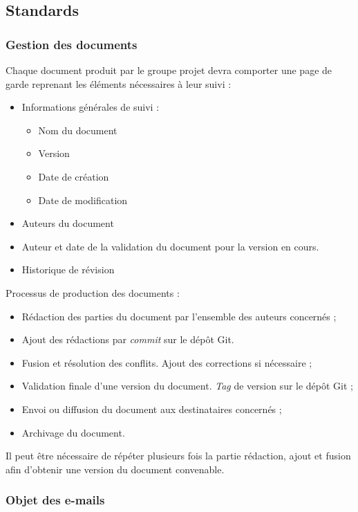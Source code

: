 \documentclass[10pt,a4paper]{article}
\begin{document}
\subsection{Standards}

\subsubsection{Gestion des documents}

Chaque document produit par le groupe projet devra comporter une page de garde reprenant les éléments nécessaires à leur suivi :
\begin{itemize}
\item Informations générales de suivi :
\begin{itemize} 
	\renewcommand{\labelitemii}{$\cdot$}
	\item Nom du document
	\item Version
	\item Date de création
	\item Date de modification
\end{itemize}
\item Auteurs du document
\item Auteur et date de la validation du document pour la version en cours.
\item Historique de révision
\end{itemize}

\noindent Processus de production des documents :
\begin{itemize}
\item Rédaction des parties du document par l'ensemble des auteurs concernés ;
\item Ajout des rédactions par \textit{commit} sur le dépôt Git. 
\item Fusion et résolution des conflits. Ajout des corrections si nécessaire ;
\item Validation finale d'une version du document. \textit{Tag} de version sur le dépôt Git ;
\item Envoi ou diffusion du document aux destinataires concernés ;
\item Archivage du document.
\end{itemize}

Il peut être nécessaire de répéter plusieurs fois la partie rédaction, ajout et fusion afin d'obtenir une version du document convenable.

\subsubsection{Objet des e-mails}
\end{document}

